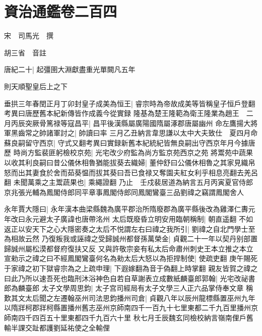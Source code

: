 \section{資治通鑑卷二百四}
宋　司馬光　撰

胡三省　音註

唐紀二十|{
	起彊圉大淵獻盡重光單闕凡五年}


則天順聖皇后上之下

垂拱三年春閏正月丁卯封皇子成美為恒王|{
	睿宗時為帝故成美等皆稱皇子恒戶登翻　考異曰唐歷舊本紀新傳皆作成義今從實録}
隆基為楚王隆範為衛王隆業為趙王　二月丙辰突厥骨篤禄等寇昌平|{
	昌平後漢縣屬廣陽國隋屬涿郡唐屬幽州}
命左鷹揚大將軍黑齒常之帥諸軍討之|{
	帥讀曰率}
三月乙丑納言韋思謙以太中大夫致仕　夏四月命蘇良嗣留守西京|{
	守式又翻考異曰實録新舊本紀統紀皆無良嗣出守西京年月今據唐歷}
時尚方監裴匪躬檢校京苑|{
	光宅改少府監為尚方監京苑西京之苑}
將鬻苑中蔬果以收其利良嗣曰昔公儀休相魯猶能拔葵去織婦|{
	董仲舒曰公儀休相魯之其家見織帛怒而出其妻食於舍而茹葵愠而拔其葵曰吾已食禄又奪園夫紅女利乎相息亮翻去羌呂翻}
未聞萬乘之主鬻蔬果也|{
	乘繩證翻}
乃止　壬戍裴居道為納言五月丙寅夏官侍郎京兆張光輔為鳳閣侍郎同平章事鳳閣侍郎同鳳閣鸞臺三品劉禕之竊謂鳳閣舍人

永年賈大隱曰|{
	永年漢本曲梁縣魏為廣平郡治所隋廢郡為廣平縣後改為雞澤仁夀元年改曰永元避太子廣諱也唐帶洺州}
太后既廢昏立明安用臨朝稱制|{
	朝直遥翻}
不如返正以安天下之心大隱密奏之太后不悦謂左右曰禕之我所引|{
	劉禕之自北門學士至為相故云然}
乃復叛我或誣禕之受歸誠州都督孫萬榮金|{
	貞觀二十一年以契丹别部置歸誠州屬松漠都督府復扶又反}
又與許敬宗妾有私太后命肅州刺史王本立推之本立宣勑示之禕之曰不經鳳閣鸞臺何名為勑太后大怒以為拒捍制使|{
	使疏吏翻}
庚午賜死于家禕之初下獄睿宗為之上疏申理|{
	下遐嫁翻為音于偽翻上時掌翻}
親友皆賀之禕之曰此乃所以速吾死也臨刑沐浴神色自若自草謝表立成數紙麟臺郎郭翰|{
	光宅改祕書郎為麟臺郎}
太子文學周思鈞|{
	太子宫司經局有太子文學三人正六品掌侍奉文章}
稱歎其文太后聞之左遷翰巫州司法思鈞播州司倉|{
	貞觀八年以辰州龍標縣置巫州九年以隋牂柯郡牂柯縣置播州舊志巫州京師南四千一百九十七里東都二千九百里播州京師南四千四百五十里東都四千九百六十里}
秋七月壬辰魏玄同檢校納言嶺南俚戶舊輸半課交趾都護劉延祐使之全輸俚

